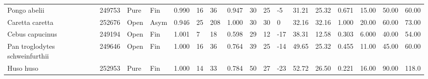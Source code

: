 \documentclass[10pt,a4paper]{amsart}
\theoremstyle{definition}
\theoremstyle{remark}
\numberwithin{equation}{section}
\begin{document}
\begin{table}[ht]
{\begin{tabular}{lllllllllllllllll}
Pongo abelii & 249753 & Pure & Fin & 0.990 & 16 & 36 & 0.947 & 30 & 25 & -5 & 31.21 & 25.32 & 0.671 & 15.00 & 50.00 & 60.00 \\
Caretta caretta & 252676 & Open & Asym & 0.946 & 25 & 208 & 1.000 & 30 & 30 & 0 & 32.16 & 32.16 & 1.000 & 20.00 & 60.00 & 73.00 \\
Cebus capucinus & 249194 & Open & Fin & 1.001 & 7 & 18 & 0.598 & 29 & 12 & -17 & 38.31 & 12.58 & 0.303 & 6.000 & 40.00 & 54.00 \\
Pan troglodytes schweinfurthii & 249646 & Open & Fin & 1.000 & 16 & 36 & 0.764 & 39 & 25 & -14 & 49.65 & 25.32 & 0.455 & 11.00 & 45.00 & 60.00 \\
Huso huso & 252953 & Pure & Fin & 1.000 & 14 & 33 & 0.784 & 50 & 27 & -23 & 52.72 & 26.50 & 0.221 & 16.00 & 90.00 & 118.0 \\
\hline
\end{tabular}
}
\end{table}

\FloatBarrier






\end{document}
